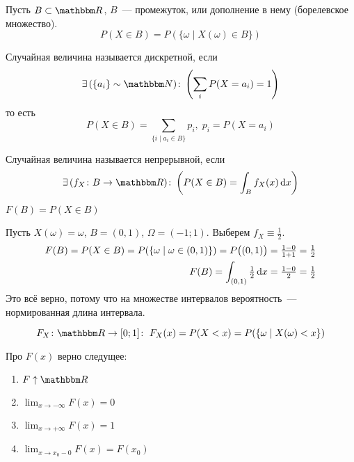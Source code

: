 \documentclass[12pt,timbord]{../../../notes}
\begin{document}
\begin{defn}\label{defn:prob::randscal::inborel}
  Пусть $B\subset \R$, $B$~--- промежуток, или дополнение в нему (борелевское множество).
  \[
    P(X\in B) = P(\{\omega \mid X(\omega) \in B\})
  \]
\end{defn}

\begin{defn}\label{defn:prob::randscal::disc}
  Случайная величина называется дискретной, если
  \[
    \exists\,(\{a_i\} \sim \N)\colon \left( \sum_{i} P(X = a_i) = 1 \right)
  \]
  то есть 
  \[
    P(X\in B) = \sum_{\{i\mid a_i\in B\}} p_i, \; p_i = P(X = a_i)
  \]
\end{defn}
\begin{defn}\label{defn:prob::randscal::cony}
  Случайная величина называется непрерывной, если
  \[
    \exists\,(f_X\colon B\to \R )\colon \left( P(X\in B) = \int_{B} f_X(x)\, \del x \right)
  \]
\end{defn}
\begin{defn}\label{defn:prob::randscal::distr}
  $F(B) = P(X \in B)$
\end{defn}

\begin{exmp}\label{exmp:prob::randscal::cont}
  Пусть $X(\omega) = \omega$, $B = (0,1)$, $\Omega = (-1;1)$. Выберем  $f_X \equiv \frac{1}{2}$.
  \begin{align*}
    F(B) = P(X\in B) = P(\{\omega \mid \omega \in (0,1)\}) = P\bigl((0,1)\bigr) = \tfrac{1-0}{1+1}
    = \tfrac{1}{2} \\
    F(B) = \int_{(0,1)} \tfrac{1}{2}\, \mathrm{d} x  = \tfrac{1-0}{2} = \tfrac{1}{2}
  \end{align*}
  Это всё верно, потому что на множестве интервалов вероятность~--- нормированная длина интервала.
\end{exmp}

\begin{defn}\label{defn:prob::randscal::distrfun}
  \[
    F_X\colon \R\to [0;1] \colon\; F_X(x) = P(X < x) = P(\{\omega \mid X(\omega) < x \})
  \]
\end{defn}

\begin{prop}\label{prop:prob::randscal::distrfun}
  Про $F(x)$ верно следущее:
  \begin{enumerate}
    \item $F\displaystyle\uparrow \R$
    \item $\displaystyle\lim_{x\to -\infty}F(x) = 0$
    \item $\displaystyle\lim_{x\to +\infty}F(x) = 1$
    \item $\displaystyle\lim_{x\to x_0-0}F(x) = F(x_0)$
  \end{enumerate}
\end{prop}
\end{document}
